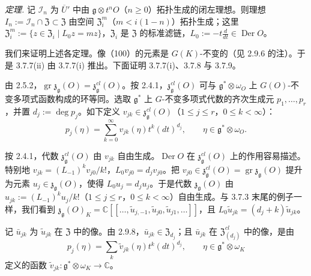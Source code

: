 
 \emph{定理.} 记 $\mathcal{I}_n$ 为 $\overline{U}'$ 中由 $\mathfrak{g}\otimes t^nO$（$n\ge 0$）拓扑生成的闭左理想。则理想 $I_n:=\mathcal{I}_n\cap\mathfrak{Z}\subset\mathfrak{Z}$ 由空间 $\mathfrak{Z}^m_i$（$m<i(1-n)$）拓扑生成；这里 $\mathfrak{Z}^m_i:=\{z\in\mathfrak{Z}_i\mid L_0z=mz\}$，$\mathfrak{Z}_i$ 是 $\mathfrak{Z}$ 的标准滤链，$L_0:=-t\frac{d}{dt}\in\operatorname{Der}O$。

 我们来证明上述各定理。像（100）的元素是 $G(K)$-不变的（见 2.9.6 的注）。于是 3.7.7(ii) 由 3.7.7(i) 推出。下面证明 3.7.7(i)、3.7.8 与 3.7.9。

由 2.5.2，$\operatorname{gr}\mathfrak{z}_{\mathfrak{g}}(O)=\mathfrak{z}^{cl}_{\mathfrak{g}}(O)$。按 2.4.1，$\mathfrak{z}^{cl}_{\mathfrak{g}}(O)$ 可与 $\mathfrak{g}^*\otimes\omega_O$ 上 $G(O)$-不变多项式函数构成的环等同。选取 $\mathfrak{g}^*$ 上 $G$-不变多项式代数的齐次生成元 $p_1,\dots,p_r$，并置 $d_j:=\deg p_j$。如下定义 $v_{jk}\in\mathfrak{z}^{cl}_{\mathfrak{g}}(O)$（$1\le j\le r$，$0\le k<\infty$）：
\begin{equation}\tag{105}
p_j(\eta)=\sum_{k=0}^{\infty}v_{jk}(\eta)t^k(dt)^{d_j},\qquad \eta\in\mathfrak{g}^*\otimes\omega_O.
\end{equation}

按 2.4.1，代数 $\mathfrak{z}^{cl}_{\mathfrak{g}}(O)$ 由 $v_{jk}$ 自由生成。$\operatorname{Der}O$ 在 $\mathfrak{z}^{cl}_{\mathfrak{g}}(O)$ 上的作用容易描述。特别地 $v_{jk}=(L_{-1})^kv_{j0}/k!$，$L_0v_{j0}=d_jv_{j0}$。把 $v_{j0}\in\mathfrak{z}^{cl}_{\mathfrak{g}}(O)=\operatorname{gr}\mathfrak{z}_{\mathfrak{g}}(O)$ 提升为元素 $u_j\in\mathfrak{z}_{\mathfrak{g}}(O)$，使得 $L_0u_j=d_ju_j$。于是代数 $\mathfrak{z}_{\mathfrak{g}}(O)$ 由 $u_{jk}:=(L_{-1})^ku_j/k!$（$1\le j\le r$，$0\le k<\infty$）自由生成。与 3.7.3 末尾的例子一样，我们看到 $\mathfrak{z}_{\mathfrak{g}}(O)_K=\mathbb{C}[[\dots,\tilde{u}_{j,-1},\tilde{u}_{j0},\tilde{u}_{j1},\dots]]$，且 $L_0\tilde{u}_{jk}=(d_j+k)\tilde{u}_{jk}$。

记 $\bar{u}_{jk}$ 为 $\tilde{u}_{jk}$ 在 $\mathfrak{Z}$ 中的像。由 2.9.8，$\bar{u}_{jk}\in\mathfrak{Z}_{d_j}$；且 $\bar{u}_{jk}$ 在 $\mathfrak{Z}^{cl}_{(d_j)}$ 中的像，是由
\begin{equation}\tag{106}
p_j(\eta)=\sum_k\tilde{v}_{jk}(\eta)t^k(dt)^{d_j},\qquad \eta\in\mathfrak{g}^*\otimes\omega_K
\end{equation}
定义的函数 $\tilde{v}_{jk}:\mathfrak{g}^*\otimes\omega_K\to\mathbb{C}$。

